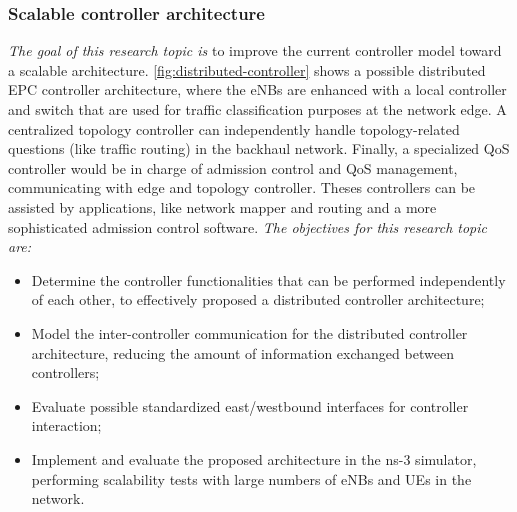



\subsubsection{Scalable controller architecture}
\label{subsec:distributed}

\emph{The goal of this research topic is} to improve the current controller
model toward a scalable architecture. \autoref{fig:distributed-controller}
shows a possible distributed \ac{EPC} controller architecture, where the
\acp{eNB} are enhanced with a local controller and switch that are used for
traffic classification purposes at the network edge. A centralized topology
controller can independently handle topology-related questions (like traffic
routing) in the backhaul network. Finally, a specialized \ac{QoS} controller
would be in charge of admission control and \ac{QoS} management, communicating
with edge and topology controller. Theses controllers can be assisted by
applications, like network mapper and routing and a more sophisticated
admission control software. 
\emph{The objectives for this research topic are:}
\begin{itemize}
  \item Determine the controller functionalities that can be performed
  independently of each other, to effectively proposed a distributed controller
  architecture;

  \item Model the inter-controller communication for the distributed controller
  architecture, reducing the amount of information exchanged between
  controllers;

  \item Evaluate possible standardized east/westbound interfaces for controller
  interaction;

  \item Implement and evaluate the proposed architecture in the \ac{ns-3}
  simulator, performing scalability tests with large numbers of \acp{eNB} and
  \acp{UE} in the network.
\end{itemize}

